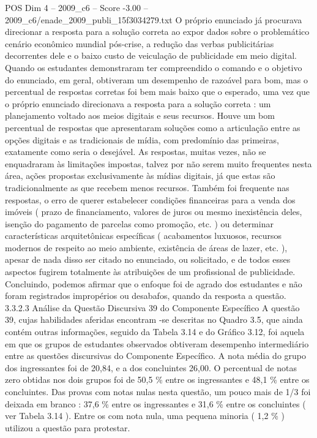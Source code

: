 \begin{textsample}{POS Dim 4 – 2009\_c6 – Score -3.00 – 2009\_c6/enade\_2009\_publi\_15f3034279.txt}
O próprio enunciado já procurava direcionar a resposta para a solução correta ao expor dados sobre o problemático cenário econômico mundial pós-crise, a redução das verbas publicitárias decorrentes dele e o baixo custo de veiculação de publicidade em meio digital.
Quando os estudantes demonstraram ter compreendido o comando e o objetivo do enunciado, em geral, obtiveram um desempenho de razoável para bom, mas o percentual de respostas corretas foi bem mais baixo que o esperado, uma vez que o próprio enunciado direcionava a resposta para a solução correta : um planejamento voltado aos meios digitais e seus recursos.
Houve um bom percentual de respostas que apresentaram soluções como a articulação entre as opções digitais e as tradicionais de mídia, com predomínio das primeiras, exatamente como seria o desejável.
As respostas, muitas vezes, não se enquadraram às limitações impostas, talvez por não serem muito frequentes nesta área, ações propostas exclusivamente às mídias digitais, já que estas são tradicionalmente as que recebem menos recursos.
Também foi frequente nas respostas, o erro de querer estabelecer condições financeiras para a venda dos imóveis ( prazo de financiamento, valores de juros ou mesmo inexistência deles, isenção do pagamento de parcelas como promoção, etc. ) ou determinar características arquitetônicas específicas ( acabamentos luxuosos, recursos modernos de respeito ao meio ambiente, existência de áreas de lazer, etc. ), apesar de nada disso ser citado no enunciado, ou solicitado, e de todos esses aspectos fugirem totalmente às atribuições de um profissional de publicidade.
Concluindo, podemos afirmar que o enfoque foi de agrado dos estudantes e não foram registrados impropérios ou desabafos, quando da resposta a questão. 3.3.2.3 Análise da Questão Discursiva 39 do Componente Específico A questão 39, cujas habilidades aferidas encontram -se descritas no Quadro 3.5, que ainda contém outras informações, seguido da Tabela 3.14 e do Gráfico 3.12, foi aquela em que os grupos de estudantes observados obtiveram desempenho intermediário entre as questões discursivas do Componente Específico.
A nota média do grupo dos ingressantes foi de 20,84, e a dos concluintes 26,00.
O percentual de notas zero obtidas nos dois grupos foi de 50,5 \% entre os ingressantes e 48,1 \% entre os concluintes.
Das provas com notas nulas nesta questão, um pouco mais de 1/3 foi deixada em branco : 37,6 \% entre os ingressantes e 31,6 \% entre os concluintes ( ver Tabela 3.14 ).
Entre os com nota nula, uma pequena minoria ( 1,2 \% ) utilizou a questão para protestar.

\end{textsample}

